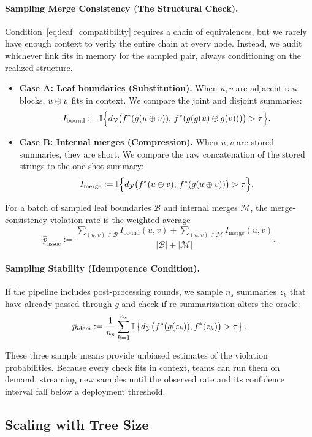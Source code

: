 \paragraph{Sampling Merge Consistency (The Structural Check).}
Condition~\eqref{eq:leaf_compatibility} requires a chain of equivalences, but we rarely have enough context to verify the entire chain at every node. Instead, we audit whichever link fits in memory for the sampled pair, always conditioning on the realized structure.
\begin{itemize}
    \item \textbf{Case A: Leaf boundaries (Substitution).} When $u,v$ are adjacent raw blocks, $u\oplus v$ fits in context. We compare the joint and disjoint summaries:
    \[
    I_{\text{bound}} := \mathbb{I}\Big\{ d_{\mathcal{Y}}\big(f^{\ast}(g(u\oplus v)),\,f^{\ast}(g(g(u)\oplus g(v)))\big) > \tau \Big\}.
    \]
    \item \textbf{Case B: Internal merges (Compression).} When $u,v$ are stored summaries, they are short. We compare the raw concatenation of the stored strings to the one-shot summary:
    \[
    I_{\text{merge}} := \mathbb{I}\Big\{ d_{\mathcal{Y}}\big(f^{\ast}(u\oplus v),\,f^{\ast}(g(u\oplus v))\big) > \tau \Big\}.
    \]
\end{itemize}
For a batch of sampled leaf boundaries $\mathcal{B}$ and internal merges $\mathcal{M}$, the merge-consistency violation rate is the weighted average
\[
\hat{p}_{\text{assoc}} := \frac{\sum_{(u,v)\in\mathcal{B}} I_{\text{bound}}(u,v) + \sum_{(u,v)\in\mathcal{M}} I_{\text{merge}}(u,v)}{|\mathcal{B}| + |\mathcal{M}|}.
\]

\paragraph{Sampling Stability (Idempotence Condition).}
If the pipeline includes post-processing rounds, we sample $n_s$ summaries $z_k$ that have already passed through $g$ and check if re-summarization alters the oracle:
\[
\hat{p}_{\text{idem}} := \frac{1}{n_s} \sum_{k=1}^{n_s} \mathbb{I}\left\{ d_{\mathcal{Y}}\big(f^{\ast}(g(z_k)), f^{\ast}(z_k)\big) > \tau \right\}.
\]

These three sample means provide unbiased estimates of the violation probabilities. Because every check fits in context, teams can run them on demand, streaming new samples until the observed rate and its confidence interval fall below a deployment threshold.

\subsection{Scaling with Tree Size}

